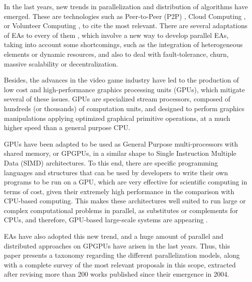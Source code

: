 \documentclass{article}
\begin{document}
In the last years, new trends in parallelization and
distribution of algorithms have emerged. These are technologies such
as Peer-to-Peer (P2P) \cite{P2P-wikipedia}, Cloud Computing
\cite{CloudComputing-wikipedia}, or Volunteer Computing
\cite{VolunteerComputing-wikipedia}, to cite the most relevant. There
are several adaptations of EAs to every of them
\cite{laredo2010evag,SOA-Garcia-SanchezGCAG13,VermaCloud10,Nouman-VolunComp14}, 
which involve a new way to develop parallel EAs, taking into account some shortcomings, such as the integration of heterogeneous elements or dynamic resources, and also to deal with fault-tolerance, churn, massive
scalability or decentralization. 

Besides, the advances in the video game industry have led to the production of low cost and high-performance graphics processing units (GPUs), which mitigate several of these issues.
GPUs are specialized stream processors, composed of hundreds (or
thousands) of computation units, and designed to perform graphics
manipulations applying optimized graphical primitive operations, at a
much higher speed than a general purpose CPU.

GPUs have been adapted to be used as General Purpose multi-processors
with shared memory, or GPGPUs, in a similar shape to Single
Instruction Multiple Data (SIMD)\cite{SIMD-wikipedia} architectures.
To this end, there are specific programming languages and structures that can be used by developers to write their own programs to be run on a GPU, which are very effective for scientific computing in terms of cost, given their extremely high performance in the comparison with CPU-based computing.
This makes these architectures well suited to run large or complex computational problems in parallel, as substitutes or complements for CPUs, and therefore, GPU-based large-scale systems are appearing \cite{KindratenkoTrends11}.

EAs have also adopted this new trend, and a huge amount of parallel and distributed approaches on GPGPUs have arisen in the last years.
Thus, this paper presents a taxonomy regarding the different
parallelization models, along with a complete survey of the most
relevant proposals in this scope, extracted after revising more than
200 works published since their emergence in 2004.
\end{document}
